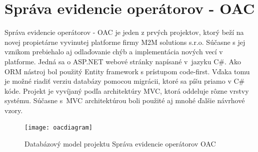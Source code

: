\documentclass[11pt, oneside]{report}
\begin{document}
\section{Správa evidencie operátorov - OAC}
Správa evidencie operátorov - OAC  je jeden z prvých projektov, ktorý beží na novej propietárne vyvinutej platforme firmy M2M solutions s.r.o. Súčasne s jej vznikom prebiehalo aj odlaďovanie chýb  a implementácia nových vecí v platforme. Jedná sa o ASP.NET webové stránky napísané v~jazyku C\#. Ako ORM nástroj  bol použitý Entity framework s prístupom code-first. Vďaka tomu je možné riadiť verziu  databázy pomocou migrácii, ktoré sa píšu priamo v C\# kóde. Projekt je vyvíjaný podľa architektúry MVC, ktorá oddeluje rôzne vrstvy systému. Súčasne s~MVC architektúrou boli použité aj mnohé ďalšie návrhové vzory. 

\begin{figure}[H]
    \centering
    \texttt{[image: oacdiagram]}
    \caption{Databázový model projektu Správa evidencie operátorov OAC}
    \label{fig:oacdiagram}
\end{figure}
\end{document}
